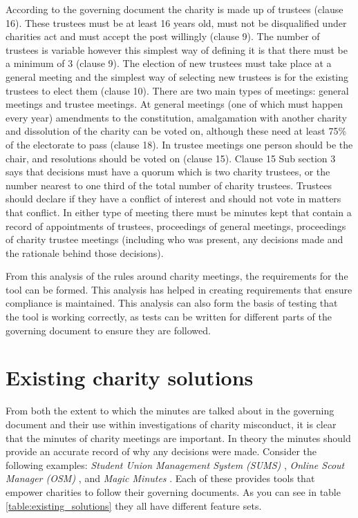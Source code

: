 \documentclass{UoYCSproject}
\begin{document}
According to the governing document the charity is made up of trustees (clause 16). These trustees must be at least 16 years old, must not be disqualified under charities act and must accept the post willingly (clause 9). The number of trustees is variable however this simplest way of defining it is that there must be a minimum of 3 (clause 9). The election of new trustees must take place at a general meeting and the simplest way of selecting new trustees is for the existing trustees to elect them (clause 10). There are two main types of meetings: general meetings and trustee meetings. At general meetings (one of which must happen every year) amendments to the constitution, amalgamation with another charity and dissolution of the charity can be voted on, although these need at least 75\% of the electorate to pass (clause 18). In trustee meetings one person should be the chair, and resolutions should be voted on (clause 15). Clause 15 Sub section 3 says that decisions must have a quorum which is two charity trustees, or the number nearest to one third of the total number of charity trustees. Trustees should declare if they have a conflict of interest and should not vote in matters that conflict. In either type of meeting there must be minutes kept that contain a record of appointments of trustees, proceedings of general meetings, proceedings of charity trustee meetings (including who was present, any decisions made and the rationale behind those decisions). 

From this analysis of the rules around charity meetings, the requirements for the tool can be formed. This analysis has helped in creating requirements that ensure compliance is maintained. This analysis can also form the basis of testing that the tool is working correctly, as tests can be written for different parts of the governing document to ensure they are followed.

\section{Existing charity solutions}
From both the extent to which the minutes are talked about in the governing document and their use within investigations of charity misconduct, it is clear that the minutes of charity meetings are important. In theory the minutes should provide an accurate record of why any decisions were made. Consider the following examples: \textit{Student Union Management System (SUMS)} \cite{sums_website}, \textit{Online Scout Manager (OSM)} \cite{OSM_website}, and \textit{Magic Minutes} \cite{magic_minutes_website}. Each of these provides tools that empower charities to follow their governing documents.  As you can see in table \ref{table:existing_solutions} they all have different feature sets.
\end{document}
